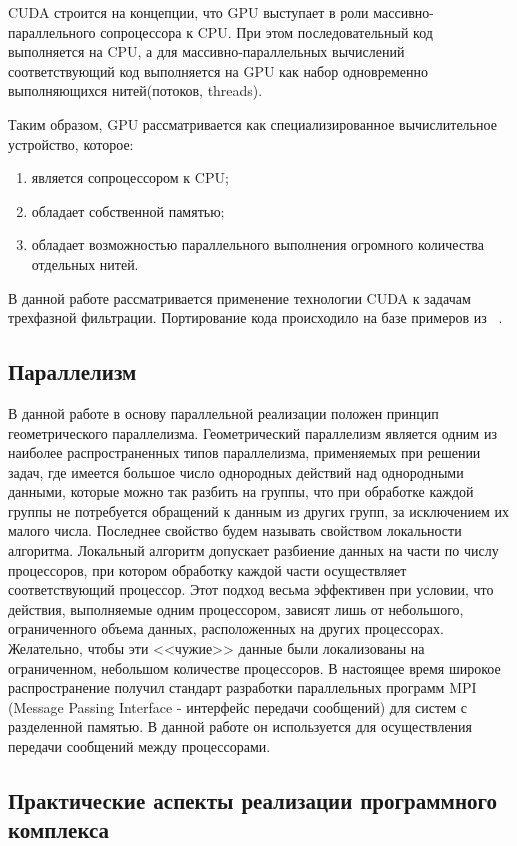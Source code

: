 CUDA строится на концепции, что GPU выступает в роли массивно-параллельного
сопроцессора к CPU. При этом последовательный код выполняется на CPU,
а для массивно-параллельных вычислений соответствующий код выполняется на
GPU как набор одновременно выполняющихся нитей(потоков, threads).

Таким образом, GPU рассматривается как специализированное вычислительное устройство,
которое:
\begin{enumerate}
  \item является сопроцессором к CPU;
  \item обладает собственной памятью;
  \item обладает возможностью параллельного выполнения огромного количества отдельных
  нитей.
\end{enumerate}

В данной работе рассматривается применение технологии CUDA к задачам 
трехфазной фильтрации. Портирование кода происходило на базе
примеров из ~\cite{Sanders-CUDA}.

\subsection{Параллелизм}

В данной работе в основу параллельной реализации положен принцип геометрического параллелизма.
Геометрический параллелизм является одним из наиболее распространенных типов
параллелизма, применяемых при решении задач, где имеется большое число
однородных действий над однородными данными, которые можно так разбить на
группы, что при обработке каждой группы не потребуется обращений к данным из
других групп, за исключением их малого числа.
Последнее свойство будем называть свойством локальности алгоритма. Локальный
алгоритм допускает разбиение данных на части по числу процессоров, при котором
обработку каждой части осуществляет соответствующий процессор. Этот подход
весьма эффективен при условии, что действия, выполняемые одним процессором,
зависят лишь от небольшого, ограниченного объема данных, расположенных на других
процессорах. Желательно, чтобы эти <<чужие>> данные были локализованы на
ограниченном, небольшом количестве процессоров.
В настоящее время широкое распространение получил стандарт разработки
параллельных программ MPI (Message Passing Interface - интерфейс передачи
сообщений) для систем с разделенной памятью. 
В данной работе он используется для осуществления передачи
сообщений между процессорами.

\subsection{Практические аспекты реализации программного комплекса}

